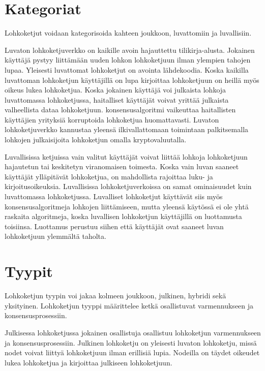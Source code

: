 \documentclass[utf8,bachelor]{gradu3}
\begin{document}
\section{Kategoriat}
Lohkoketjut voidaan kategorisoida kahteen joukkoon, luvattomiin ja luvallisiin.

Luvaton lohkoketjuverkko on kaikille avoin hajauttettu tilikirja-alusta. 
Jokainen käyttäjä pystyy liittämään uuden lohkon lohkoketjuun ilman ylempien tahojen lupaa. Yleisesti luvattomat lohkoketjut on avointa lähdekoodia.
Koska kaikilla luvattoman lohkoketjun käyttäjillä on lupa kirjoittaa lohkoketjuun on heillä myös oikeus lukea lohkoketjua.
Koska jokainen käyttäjä voi julkaista lohkoja luvattomassa lohkoketjussa, haitalliset käyttäjät voivat yrittää julkaista valheellista dataa lohkoketjuun.
konsensusalgoritmi vaikeuttaa haitallisten käyttäjien yrityksiä korruptoida lohkoketjua huomattavasti.
Luvaton lohkoketjuverkko kannustaa yleensä ilkivallattomaan toimintaan palkitsemalla lohkojen julkaisijoita lohkoketjun omalla kryptovaluutalla.

Luvallisissa ketjuissa vain valitut käyttäjät voivat liittää lohkoja lohkoketjuun hajautetun tai keskitetyn viranomaisen toimesta.
Koska vain luvan saaneet käyttäjät ylläpitävät lohkoketjua, on mahdollista rajoittaa luku- ja kirjoitusoikeuksia.
Luvallisissa lohkoketjuverkoissa on samat ominaisuudet kuin luvattomassa lohkoketjussa.
Luvalliset lohkoketjut käyttävät siis myös konsensusalgoritmeja lohkojen liittämiseen, mutta yleensä käytössä ei ole yhtä raskaita algoritmeja, koska luvallisen lohkoketjun käyttäjillä on luottamusta toisiinsa. Luottamus perustuu siihen että käyttäjät ovat saaneet luvan lohkoketjuun ylemmältä taholta.

\section{Tyypit}

Lohkoketjun tyypin voi jakaa kolmeen joukkoon, julkinen, hybridi sekä yksityinen. Lohkoketjun tyyppi määrittelee ketkä osallistuvat varmennukseen ja konsensusprosessiin.

Julkisessa lohkoketjussa jokainen osallistuja osallistuu lohkoketjun varmennukseen ja konsensusprosessiin. Julkinen lohkoketju on yleisesti luvaton lohkoketju, missä nodet voivat liittyä lohkoketjuun ilman erillisiä lupia. Nodeilla on täydet oikeudet lukea lohkoketjua ja kirjoittaa julkiseen lohkoketjuun.
\end{document}
